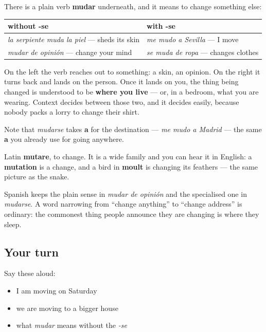 \begin{grammarlens}[title={Grammar Lens: what the -se is doing}]
There is a plain verb \textbf{mudar} underneath, and it means to change something else:

\noindent
\begin{tabularx}{\linewidth}{@{}>{\raggedright\arraybackslash}X>{\raggedright\arraybackslash}X@{}}
\toprule
\textbf{without -se} & \textbf{with -se} \\
\midrule
\emph{la serpiente muda la piel} — sheds its skin & \emph{me mudo a Sevilla} — I move \\
\emph{mudar de opinión} — change your mind & \emph{se muda de ropa} — changes clothes \\
\bottomrule
\end{tabularx}

On the left the verb reaches out to something: a skin, an opinion. On the right it turns back and lands on the person. Once it lands on you, the thing being changed is understood to be \textbf{where you live} — or, in a bedroom, what you are wearing. Context decides between those two, and it decides easily, because nobody packs a lorry to change their shirt.

Note that \emph{mudarse} takes \textbf{a} for the destination — \emph{me mudo a Madrid} — the same \textbf{a} you already use for going anywhere.
\end{grammarlens}

\begin{cousinweb}
Latin \textbf{mutare}, to change. It is a wide family and you can hear it in English: a \textbf{mutation} is a change, and a bird in \textbf{moult} is changing its feathers — the same picture as the snake.

Spanish keeps the plain sense in \emph{mudar de opinión} and the specialised one in \emph{mudarse}. A word narrowing from \textquotedblleft{}change anything\textquotedblright{} to \textquotedblleft{}change address\textquotedblright{} is ordinary: the commonest thing people announce they are changing is where they sleep.
\end{cousinweb}

\subsection*{Your turn}
Say these aloud:

\begin{itemize}
\raggedright
  \item I am moving on Saturday
  \item we are moving to a bigger house
  \item what \emph{mudar} means without the \emph{-se}
\end{itemize}


